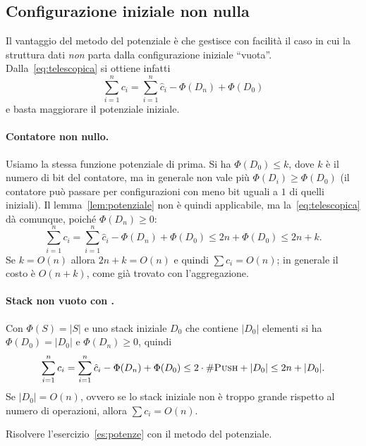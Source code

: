 \subsection{Configurazione iniziale non nulla}
Il vantaggio del metodo del potenziale è che gestisce con facilità il caso in cui la struttura dati \emph{non} parta dalla configurazione iniziale ``vuota''. Dalla~\eqref{eq:telescopica} si ottiene infatti
\[
\sum_{i=1}^{n} c_i = \sum_{i=1}^{n} \hat{c}_i - \Phi(D_n) + \Phi(D_0)
\]
e basta maggiorare il potenziale iniziale.

\paragraph{Contatore non nullo.}
Usiamo la stessa funzione potenziale di prima. Si ha $\Phi(D_0) \le k$, dove $k$ è il numero di bit del contatore, ma in generale non vale più $\Phi(D_i) \ge \Phi(D_0)$ (il contatore può passare per configurazioni con meno bit uguali a $1$ di quelli iniziali). Il lemma~\ref{lem:potenziale} non è quindi applicabile, ma la~\eqref{eq:telescopica} dà comunque, poiché $\Phi(D_n) \ge 0$:
\[
\sum_{i=1}^{n} c_i = \sum_{i=1}^{n} \hat{c}_i - \Phi(D_n) + \Phi(D_0) \le 2n + \Phi(D_0) \le 2n + k.
\]
Se $k = O(n)$ allora $2n+k = O(n)$ e quindi $\sum c_i = O(n)$; in generale il costo è $O(n+k)$, come già trovato con l'aggregazione.

\paragraph{Stack non vuoto con \MultiPop.}
Con $\Phi(S) = |S|$ e uno stack iniziale $D_0$ che contiene $|D_0|$ elementi si ha $\Phi(D_0) = |D_0|$ e $\Phi(D_n) \ge 0$, quindi
\[
\sum_{i=1}^{n} c_i = \sum_{i=1}^{n} \hat{c}_i - \Phi(D_n) + \Phi(D_0) \le 2\cdot\#\textsc{Push} + |D_0| \le 2n + |D_0|.
\]
Se $|D_0| = O(n)$, ovvero se lo stack iniziale non è troppo grande rispetto al numero di operazioni, allora $\sum c_i = O(n)$.

\begin{esercizio}
Risolvere l'esercizio~\ref{es:potenze} con il metodo del potenziale.
\end{esercizio}

